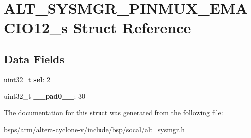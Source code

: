 \hypertarget{structALT__SYSMGR__PINMUX__EMACIO12__s}{}\section{A\+L\+T\+\_\+\+S\+Y\+S\+M\+G\+R\+\_\+\+P\+I\+N\+M\+U\+X\+\_\+\+E\+M\+A\+C\+I\+O12\+\_\+s Struct Reference}
\label{structALT__SYSMGR__PINMUX__EMACIO12__s}
\subsection*{Data Fields}
\begin{DoxyCompactItemize}
\item 
\mbox{\label{structALT__SYSMGR__PINMUX__EMACIO12__s_a9774a5289f21f30e2f529875777fdf00}} 
uint32\+\_\+t {\bfseries sel}\+: 2
\item 
\mbox{\label{structALT__SYSMGR__PINMUX__EMACIO12__s_aaad6eedd9713f5642c7f6794b2d75423}} 
uint32\+\_\+t {\bfseries \+\_\+\+\_\+pad0\+\_\+\+\_\+}\+: 30
\end{DoxyCompactItemize}


The documentation for this struct was generated from the following file\+:\begin{DoxyCompactItemize}
\item 
bsps/arm/altera-\/cyclone-\/v/include/bsp/socal/\mbox{\hyperlink{alt__sysmgr_8h}{alt\+\_\+sysmgr.\+h}}\end{DoxyCompactItemize}
